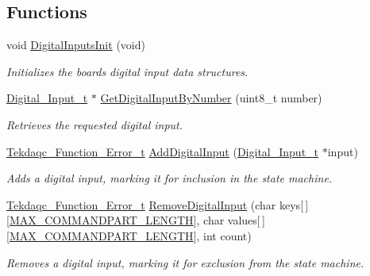 \subsection*{Functions}
\begin{DoxyCompactItemize}
\item 
void \hyperlink{group__digital__input_gacf4e27adc3b6643e12e01e4d1000db63}{Digital\-Inputs\-Init} (void)
\begin{DoxyCompactList}\small\item\em Initializes the boards digital input data structures. \end{DoxyCompactList}\item 
\hyperlink{struct_digital___input__t}{Digital\-\_\-\-Input\-\_\-t} $\ast$ \hyperlink{group__digital__input_gadfa62573aaa64c6bdcbb94c164099154}{Get\-Digital\-Input\-By\-Number} (uint8\-\_\-t number)
\begin{DoxyCompactList}\small\item\em Retrieves the requested digital input. \end{DoxyCompactList}\item 
\hyperlink{group__tekdaqc__error_ga19df05d919ecca7a7501b35ae9080a32}{Tekdaqc\-\_\-\-Function\-\_\-\-Error\-\_\-t} \hyperlink{group__digital__input_ga654bd56de221fbfe0426cb0a18917beb}{Add\-Digital\-Input} (\hyperlink{struct_digital___input__t}{Digital\-\_\-\-Input\-\_\-t} $\ast$input)
\begin{DoxyCompactList}\small\item\em Adds a digital input, marking it for inclusion in the state machine. \end{DoxyCompactList}\item 
\hyperlink{group__tekdaqc__error_ga19df05d919ecca7a7501b35ae9080a32}{Tekdaqc\-\_\-\-Function\-\_\-\-Error\-\_\-t} \hyperlink{group__digital__input_ga3b0d15fea40d84eaf677d216e1530d89}{Remove\-Digital\-Input} (char keys\mbox{[}$\,$\mbox{]}\mbox{[}\hyperlink{group__command__parser_ga6147771b5547853f33eb838895e3d5a2}{M\-A\-X\-\_\-\-C\-O\-M\-M\-A\-N\-D\-P\-A\-R\-T\-\_\-\-L\-E\-N\-G\-T\-H}\mbox{]}, char values\mbox{[}$\,$\mbox{]}\mbox{[}\hyperlink{group__command__parser_ga6147771b5547853f33eb838895e3d5a2}{M\-A\-X\-\_\-\-C\-O\-M\-M\-A\-N\-D\-P\-A\-R\-T\-\_\-\-L\-E\-N\-G\-T\-H}\mbox{]}, int count)
\begin{DoxyCompactList}\small\item\em Removes a digital input, marking it for exclusion from the state machine. \end{DoxyCompactList}\item 

\end{DoxyCompactItemize}
